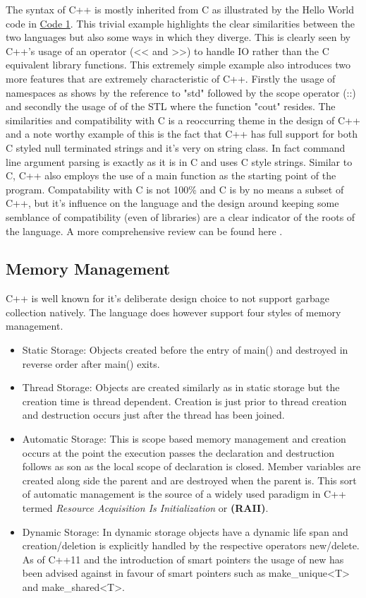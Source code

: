 \documentclass[conference, a4paper]{IEEEtran}
\begin{document}
The syntax of C++ is mostly inherited from C as illustrated by the Hello World code in \hyperref[listing:1]{Code 1}. This trivial example highlights the clear similarities between the two languages but also some ways in which they diverge. This is clearly seen by C++'s usage of an operator (<< and >>) to handle IO rather than the C equivalent library functions. This extremely simple example also introduces two more features that are extremely characteristic of C++. Firstly the usage of namespaces as shows by the reference to "std" followed by the scope operator (::) and secondly the usage of of the STL where the function "cout" resides. The similarities and compatibility with C is a reoccurring theme in the design of C++ and a note worthy example of this is the fact that C++ has full support for both C styled null terminated strings and it's very on string class. In fact command line argument parsing is exactly as it is in C and uses C style strings. Similar to C, C++ also employs the use of a main function as the starting point of the program. Compatability with C is not 100\% and C is by no means a subset of C++, but it's influence on the language and the design around keeping some semblance of compatibility (even of libraries) are a clear indicator of the roots of the language. A more comprehensive review can be found here \cite{calder1994quantifying}.

\subsection{Memory Management}

C++ is well known for it's deliberate design choice to not support garbage collection natively. The language does however support four styles of memory management. 

\begin{itemize}
    \item Static Storage: Objects created before the entry of main() and destroyed in reverse order after main() exits.
    \item Thread Storage:  Objects are created similarly as in static storage but the creation time is thread dependent. Creation is just prior to thread creation and destruction occurs just after the thread has been joined. 
    \item Automatic Storage: This is scope based memory management and creation occurs at the point the execution passes the declaration and destruction follows as son as the local scope of declaration is closed. Member variables are created along side the parent and are destroyed when the parent is. This sort of automatic management is the source of a widely used paradigm in C++ termed \textit{Resource Acquisition Is Initialization} or \textbf{(RAII)}.
    \item Dynamic Storage: In dynamic storage objects have a dynamic life span and creation/deletion is explicitly handled by the respective operators new/delete. As of C++11 and the introduction of smart pointers the usage of new has been advised against in favour of smart pointers such as make\_unique<T> and make\_shared<T>.

\end{itemize}
\end{document}

